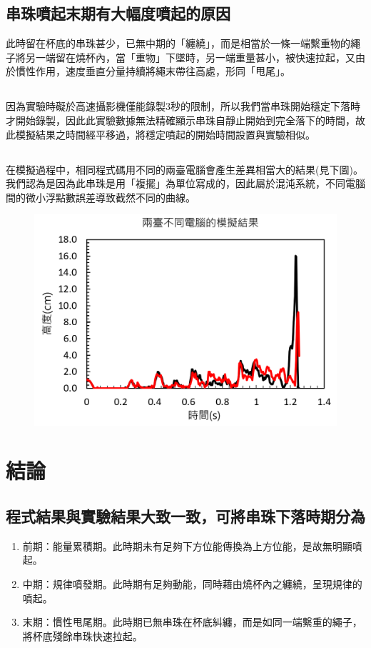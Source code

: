 \documentclass[11pt,twoside,b5paper]{article}
\begin{document}
\subsection{串珠噴起末期有大幅度噴起的原因}
此時留在杯底的串珠甚少，已無中期的「纏繞」，而是相當於一條一端繫重物的繩子將另一端留在燒杯內，當「重物」下墜時，另一端重量甚小，被快速拉起，又由於慣性作用，速度垂直分量持續將繩末帶往高處，形同「甩尾」。

\subsection{}
因為實驗時礙於高速攝影機僅能錄製3秒的限制，所以我們當串珠開始穩定下落時才開始錄製，因此此實驗數據無法精確顯示串珠自靜止開始到完全落下的時間，故此模擬結果之時間經平移過，將穩定噴起的開始時間設置與實驗相似。

\subsection{}
在模擬過程中，相同程式碼用不同的兩臺電腦會產生差異相當大的結果(見下圖)。我們認為是因為此串珠是用「複擺」為單位寫成的，因此屬於混沌系統，不同電腦間的微小浮點數誤差導致截然不同的曲線。

\begin{figure}[H]
    \centering
    \includegraphics[scale=0.5]{3.PNG}
\end{figure}

\section{結論}

\subsection{程式結果與實驗結果大致一致，可將串珠下落時期分為}
\begin{enumerate}
    \item 前期：能量累積期。此時期未有足夠下方位能傳換為上方位能，是故無明顯噴起。 
    \item 中期：規律噴發期。此時期有足夠動能，同時藉由燒杯內之纏繞，呈現規律的噴起。
    \item 末期：慣性甩尾期。此時期已無串珠在杯底糾纏，而是如同一端繫重的繩子，將杯底殘餘串珠快速拉起。
\end{enumerate}
\end{document}

